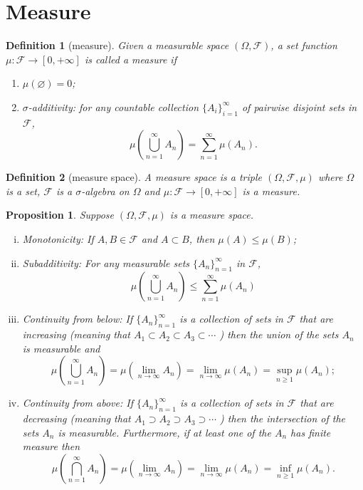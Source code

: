 \documentclass{report}
\newtheorem{definition}{Definition}[section]
\newtheorem{proposition}{Proposition}[section]
\theoremstyle{nonumberplain}
\begin{document}
\section{Measure}
\begin{definition}[measure]
	Given a measurable space $(\Omega, \mathcal{F})$, a set function $\mu:\mathcal{F}\to[0,+\infty]$ is called a \emph{measure} if
	\begin{enumerate}
	\item[(a)]$\mu(\varnothing) = 0$;
	\item[(b)]$\sigma$-additivity: for any countable collection $\{A_{i}\}_{i=1}^{\infty }$ of pairwise disjoint sets in $\mathcal{F}$,
	\[
	\mu\left(\bigcup_{n=1}^\infty A_n\right)=\sum_{n=1}^{\infty}\mu(A_n).
	\]
	\end{enumerate}
\end{definition}

\begin{definition}[measure space]
 A \emph{measure space} is a triple $(\Omega,\mathcal{F},\mu)$ where $\Omega$ is a set, $\mathcal{F}$ is a $\sigma$-algebra on $\Omega$ and $\mu:\mathcal{F}\rightarrow[0,+\infty]$ is a measure.
\end{definition} 

\begin{proposition}
	Suppose $(\Omega,\mathcal{F},\mu)$ is a measure space. 
	\begin{enumerate}[(i)]
		\item Monotonicity: If $A,B\in\mathcal{F}$ and $A\subset B$, then $\mu(A)\le \mu(B)$;
		\item Subadditivity: For any measurable sets $\{A_{n}\}_{n=1}^{\infty}$ in $\mathcal{F}$,
		$$
		\mu\left(\bigcup_{n=1}^{\infty} A_{n}\right) \leq \sum_{n=1}^{\infty} \mu\left(A_{n}\right)
		$$
		\item Continuity from below: If $\{A_{n}\}_{n=1}^{\infty}$ is a collection of sets in $\mathcal{F}$ that are increasing (meaning that $A_{1} \subset A_{2} \subset A_{3} \subset \cdots$ ) then the union of the sets $A_{n}$ is measurable and
		$$
		\mu\left(\bigcup_{n=1}^{\infty} A_{n}\right)=\mu\left(\lim_{n\to\infty} A_{n}\right)=\lim_{n \rightarrow \infty} \mu\left(A_{n}\right)=\sup_{n\geq 1} \mu\left(A_{n}\right);
		$$
		\item Continuity from above: If $\{A_{n}\}_{n=1}^{\infty}$ is a collection of sets in $\mathcal{F}$ that are decreasing (meaning that $A_{1} \supset A_{2} \supset A_{3} \supset \cdots$ ) then the intersection of the sets $A_{n}$ is measurable. Furthermore, if at least one of the $A_{n}$ has finite measure then
		$$
		\mu\left(\bigcap_{n=1}^{\infty} A_{n}\right)=\mu\left(\lim_{n\to\infty} A_{n}\right)=\lim_{n \rightarrow \infty} \mu\left(A_{n}\right)=\inf_{n \geq 1} \mu\left(A_{n}\right).
		$$
	\end{enumerate}
\end{proposition}
\end{document}

